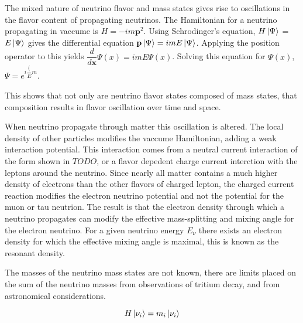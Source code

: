 The mixed nature of neutrino flavor and mass states gives rise to oscillations
in the flavor content of propagating neutrinos.
The Hamiltonian for a neutrino propagating in vaccume is
$H = -im\textbf{p}^2 $.
Using Schrodinger's equation,
$H\ket{\Psi}$ = $E\ket{\Psi}$
gives the differential equation
$\textbf{p} \ket{\Psi} = imE\ket{\Psi}$.
Applying the position operator to this yields
$\dfrac{d}{d\textbf{x}} \Psi(x) = imE\Psi(x)$.
Solving this equation for $\Psi(x)$,
$\Psi = e^{i\dfrac({E}{m}}$.

This shows that not only are neutrino flavor states
composed of mass states, that composition results
in flavor oscillation over time and space.

When neutrino propagate through matter this oscillation is altered.
The local density of other particles modifies the vaccume Hamiltonian,
adding a weak interaction potential.
This interaction comes from a neutral current interaction of the form
shown in $TODO$, or a flavor depedent charge current interction with the
leptons around the neutrino.
Since nearly all matter contains a much higher density of electrons
than the other flavors of charged lepton, the charged current reaction
modifies the electron neutrino potential and not the potential for the muon
or tau neutrion.
The result is that the electron density through which a neutrino propagates
can modify the effective mass-splitting and mixing angle for the electron
neutrino.
For a given neutrino energy $E_{\nu}$ there exists an electron density for which
the effective mixing angle is maximal, this is known as the resonant density.

The masses of the neutrino mass states are not known, there are limits placed
on the sum of the neutrino masses from observations of tritium decay, and
from astronomical considerations. %


\begin{equation}
    H \ket{\nu_i} = m_i \ket{\nu_i}
\end{equation}


